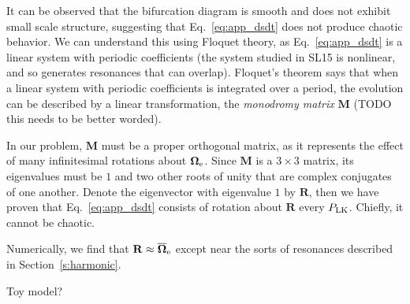 \documentclass[
        twocolumn,
        twocolappendix
    ]{aastex63}
\renewcommand*{\bm}[1]{\boldsymbol{\mathbf{#1}}}
\begin{document}
It can be observed that the bifurcation diagram is smooth and does not exhibit
small scale structure, suggesting that Eq.~\eqref{eq:app_dsdt} does not produce
chaotic behavior. We can understand this using Floquet theory, as
Eq.~\eqref{eq:app_dsdt} is a linear system with periodic coefficients (the
system studied in SL15 is nonlinear, and so generates resonances that can
overlap). Floquet's theorem says that when a linear system with periodic
coefficients is integrated over a period, the evolution can be described by a
linear transformation, the \emph{monodromy matrix} $\bm{M}$ (TODO this needs to
be better worded).

In our problem, $\bm{M}$ must be a proper orthogonal matrix, as it represents
the effect of many infinitesimal rotations about $\bm{\Omega}_{\rm e}$. Since
$\bm{M}$ is a $3 \times 3$ matrix, its eigenvalues must be $1$ and two other
roots of unity that are complex conjugates of one another. Denote the
eigenvector with eigenvalue $1$ by $\bm{R}$, then we have proven that
Eq.~\eqref{eq:app_dsdt} consists of rotation about $\bm{R}$ every $P_{\rm LK}$.
Chiefly, it cannot be chaotic.

Numerically, we find that $\bm{R} \approx \overline{\bm{\Omega}}_{\rm e}$ except
near the sorts of resonances described in Section~\ref{s:harmonic}.

Toy model?
\end{document}
